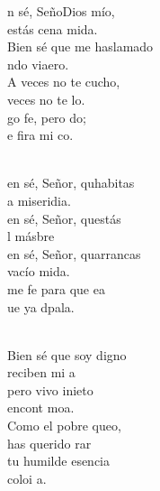\documentclass[12pt]{article}
\begin{document}
\begin{multicols*}{2}
\begin{cancion}%
	n sé, SeñoDios mío, \\
	 estás cena mida.\\
	Bien sé que me haslamado \\
	ndo viaero.\\
	A veces no te cucho, \\
	veces no te lo.\\
	go fe, pero do; \\
	e fira mi co.  \\\jump\\
	\begin{chorus}%
	en sé, Señor, quhabitas \\
	a miseridia. \\
	en sé, Señor, questás\\
	l másbre\\
	en sé, Señor, quarrancas\\
	vacío mida. \\
	me fe para que ea\\
	ue ya  dpala.\\
	\end{chorus}%
	\jump\\
	Bien sé que soy digno \\
	reciben mi a\\
	pero vivo inieto\\
	 encont  moa.\\
	Como el pobre queo, \\
	 has querido rar\\
	 tu humilde esencia \\
	 coloi a. \\
\end{cancion}%


\end{multicols*}
\end{document}
